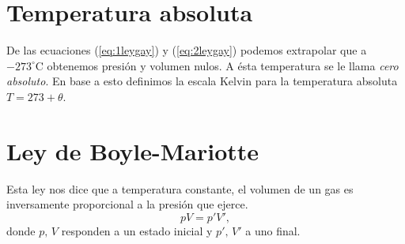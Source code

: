 \documentclass[openany]{book}
\begin{document}
\section{Temperatura absoluta}
De las ecuaciones (\ref{eq:1leygay}) y (\ref{eq:2leygay}) podemos extrapolar que a $-273^\circ\mathrm{C}$ obtenemos presión y volumen nulos. A ésta temperatura se le llama \emph{cero absoluto}. En base a esto definimos la escala Kelvin para la temperatura absoluta $T=273+\theta$.

\section{Ley de Boyle-Mariotte}
Esta ley nos dice que a temperatura constante, el volumen de un gas es inversamente proporcional a la presión que ejerce.
\begin{equation}\label{eq:boylemariotte}
	pV=p'V',
\end{equation}
donde $p,\,V$ responden a un estado inicial y $p',\,V'$ a uno final.
\end{document}
